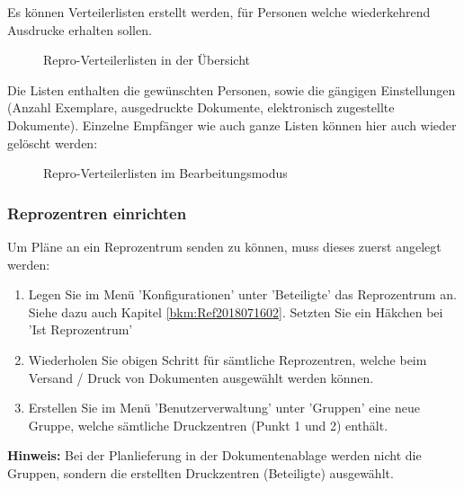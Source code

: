 Es können Verteilerlisten erstellt werden, für Personen welche wiederkehrend Ausdrucke erhalten sollen.

\begin{figure}[H]
\caption{Repro-Verteilerlisten in der Übersicht}
\end{figure}

Die Listen enthalten die gewünschten Personen, sowie die gängigen Einstellungen (Anzahl Exemplare, ausgedruckte Dokumente, elektronisch zugestellte Dokumente). Einzelne Empfänger wie auch ganze Listen können hier auch wieder gelöscht werden:

\begin{figure}[H]
\caption{Repro-Verteilerlisten im Bearbeitungsmodus}
\end{figure}

\subsubsection{Reprozentren einrichten}
\label{bkm:Ref2018071601}

Um Pläne an ein Reprozentrum senden zu können, muss dieses zuerst angelegt werden:

\begin{enumerate}
\item Legen Sie im Menü 'Konfigurationen' unter 'Beteiligte' das Reprozentrum an. Siehe dazu auch Kapitel \ref{bkm:Ref2018071602}. Setzten Sie ein Häkchen bei 'Ist Reprozentrum'
\item Wiederholen Sie obigen Schritt für sämtliche Reprozentren, welche beim Versand / Druck von Dokumenten ausgewählt werden können.
\item Erstellen Sie im Menü 'Benutzerverwaltung' unter 'Gruppen' eine neue Gruppe, welche sämtliche Druckzentren (Punkt 1 und 2) enthält.
\end{enumerate}

\textbf{Hinweis:} Bei der Planlieferung in der Dokumentenablage werden nicht die Gruppen, sondern die erstellten Druckzentren (Beteiligte) ausgewählt.




